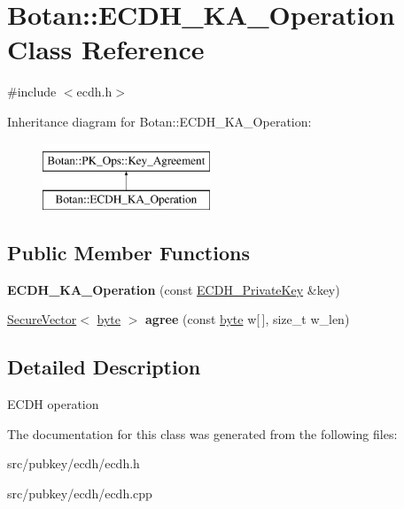 \hypertarget{classBotan_1_1ECDH__KA__Operation}{\section{Botan\-:\-:E\-C\-D\-H\-\_\-\-K\-A\-\_\-\-Operation Class Reference}
\label{classBotan_1_1ECDH__KA__Operation}
}


{\ttfamily \#include $<$ecdh.\-h$>$}

Inheritance diagram for Botan\-:\-:E\-C\-D\-H\-\_\-\-K\-A\-\_\-\-Operation\-:\begin{figure}[H]
\begin{center}
\leavevmode
\includegraphics[height=2.000000cm]{classBotan_1_1ECDH__KA__Operation}
\end{center}
\end{figure}
\subsection*{Public Member Functions}
\begin{DoxyCompactItemize}
\item 
\hypertarget{classBotan_1_1ECDH__KA__Operation_a3c139ee81129193f810d58838eff6101}{{\bfseries E\-C\-D\-H\-\_\-\-K\-A\-\_\-\-Operation} (const \hyperlink{classBotan_1_1ECDH__PrivateKey}{E\-C\-D\-H\-\_\-\-Private\-Key} \&key)}\label{classBotan_1_1ECDH__KA__Operation_a3c139ee81129193f810d58838eff6101}

\item 
\hypertarget{classBotan_1_1ECDH__KA__Operation_a19778e4a110a85a9e0025d420110f790}{\hyperlink{classBotan_1_1SecureVector}{Secure\-Vector}$<$ \hyperlink{namespaceBotan_a7d793989d801281df48c6b19616b8b84}{byte} $>$ {\bfseries agree} (const \hyperlink{namespaceBotan_a7d793989d801281df48c6b19616b8b84}{byte} w\mbox{[}$\,$\mbox{]}, size\-\_\-t w\-\_\-len)}\label{classBotan_1_1ECDH__KA__Operation_a19778e4a110a85a9e0025d420110f790}

\end{DoxyCompactItemize}


\subsection{Detailed Description}
E\-C\-D\-H operation 

The documentation for this class was generated from the following files\-:\begin{DoxyCompactItemize}
\item 
src/pubkey/ecdh/ecdh.\-h\item 
src/pubkey/ecdh/ecdh.\-cpp\end{DoxyCompactItemize}
